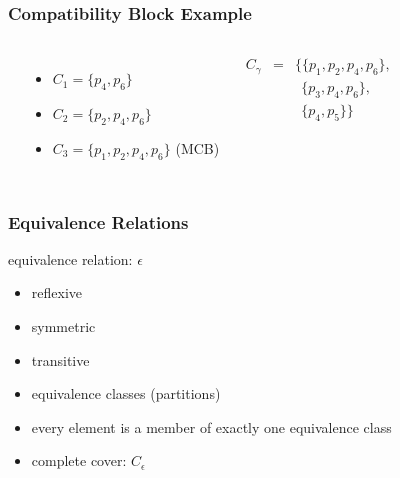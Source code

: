 \documentclass[dvipsnames]{beamer}
\begin{document}
\begin{frame}
  \frametitle{Compatibility Block Example}

  \begin{example}
    \begin{columns}
      \begin{center}
      \end{center}

      \pause
      \begin{itemize}
        \item $C_1=\{p_4,p_6\}$
        \item $C_2=\{p_2,p_4,p_6\}$
        \item $C_3=\{p_1,p_2,p_4,p_6\}$ (MCB)
      \end{itemize}

      \pause
      \medskip
      \begin{eqnarray*}
        C_\gamma & = & \{\{p_1,p_2,p_4,p_6\},\\
                 &   & ~~\{p_3,p_4,p_6\},\\
                 &   & ~~\{p_4,p_5\}\}
      \end{eqnarray*}
    \end{columns}
  \end{example}
\end{frame}

\begin{frame}
  \frametitle{Equivalence Relations}

  \begin{definition}
    \alert{equivalence relation}: $\epsilon$
    \begin{itemize}
      \item reflexive
      \item symmetric
      \item transitive
    \end{itemize}
  \end{definition}

  \pause
  \begin{itemize}
    \item \alert{equivalence classes (partitions)}
    \item every element is a member of exactly one equivalence class

    \medskip
    \item complete cover: $C_\epsilon$
  \end{itemize}
\end{frame}
\end{document}
